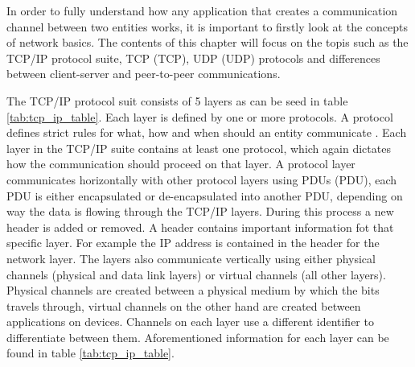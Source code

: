 In order to fully understand how any application that creates a communication channel between two entities works, it is important to firstly look at the concepts of network basics. The contents of this chapter will focus on the topis such as the TCP/IP protocol suite, TCP (\acl{TCP}), UDP (\acl{UDP}) protocols and differences between client-server and peer-to-peer communications.

The TCP/IP protocol suit consists of 5 layers as can be seed in table \ref{tab:tcp_ip_table}. Each layer is defined by one or more protocols. A protocol defines strict rules for what, how and when should an entity communicate \cite{Forouzan2010}. Each layer in the TCP/IP suite contains at least one protocol, which again dictates how the communication should proceed on that layer. A protocol layer communicates horizontally with other protocol layers using PDUs (\acl{PDU}), each PDU is either encapsulated or de-encapsulated into another PDU, depending on way the data is flowing through the TCP/IP layers. During this process a new header is added or removed. A header contains important information fot that specific layer. For example the IP address is contained in the header for the network layer. The layers also communicate vertically using either physical channels (physical and data link layers) or virtual channels (all other layers). Physical channels are created between a physical medium by which the bits travels through, virtual channels on the other hand are created between applications on devices. Channels on each layer use a different identifier to differentiate between them. Aforementioned information for each layer can be found in table \ref{tab:tcp_ip_table}.

